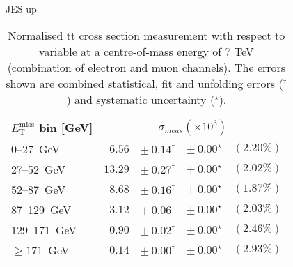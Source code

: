 \documentclass{article}
\newcommand{\ttbar}{\ensuremath{\text{t}\bar{\text{t}}}\xspace}
\newcommand{\GeV}{GeV}
\begin{document}
JES up
\begin{table}[htbp]
\setlength{\tabcolsep}{2pt}
\centering
\caption{Normalised \ttbar cross section measurement with respect to \MET variable
at a centre-of-mass energy of 7 TeV (combination of electron and muon channels). The errors shown are combined statistical, fit and unfolding errors ($^\dagger$) and systematic uncertainty ($^\star$).}
\label{tab:MET_xsections_7TeV_JES_up_combined}
\begin{tabular}{lrrrr}
\hline
$E_{\mathrm{T}}^{\mathrm{miss}}$ bin [\GeV] & \multicolumn{4}{c}{$\sigma_{meas} \left(\times 10^{3}\right)$}\\ 
\hline
0--27~\GeV &  $6.56$ & $ \pm~ 0.14^\dagger$ & $ \pm~ 0.00^\star$ & $(2.20\%)$\\ 
27--52~\GeV &  $13.29$ & $ \pm~ 0.27^\dagger$ & $ \pm~ 0.00^\star$ & $(2.02\%)$\\ 
52--87~\GeV &  $8.68$ & $ \pm~ 0.16^\dagger$ & $ \pm~ 0.00^\star$ & $(1.87\%)$\\ 
87--129~\GeV &  $3.12$ & $ \pm~ 0.06^\dagger$ & $ \pm~ 0.00^\star$ & $(2.03\%)$\\ 
129--171~\GeV &  $0.90$ & $ \pm~ 0.02^\dagger$ & $ \pm~ 0.00^\star$ & $(2.46\%)$\\ 
$\geq 171$~\GeV &  $0.14$ & $ \pm~ 0.00^\dagger$ & $ \pm~ 0.00^\star$ & $(2.93\%)$\\ 
\hline 
\end{tabular}
\end{table}
\end{document}
